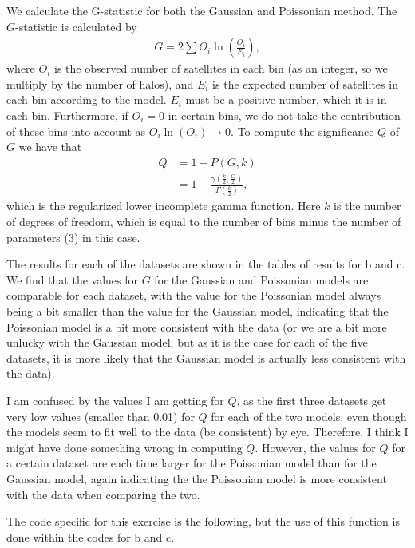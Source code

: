 We calculate the G-statistic for both the Gaussian and Poissonian method.
The $G$-statistic is calculated by 
\begin{align*}
    G = 2\sum O_i \ln(\frac{O_i}{E_i}),
\end{align*}
where $O_i$ is the observed number of satellites in each bin (as an integer, so we multiply by the number of halos), and $E_i$ is the expected number of satellites in each bin according
to the model. $E_i$ must be a positive number, which it is in each bin. Furthermore, if $O_i=0$ in certain bins, we do not take the contribution of these bins into account as $O_i\ln(O_i)\to 0$.
To compute the significance $Q$ of $G$ we have that 
\begin{align*}
    Q &= 1-P(G,k)\\
    &= 1-\frac{\gamma(\frac{k}{2},\frac{G}{2})}{\Gamma(\frac{k}{2})},
\end{align*} 
which is the regularized lower incomplete gamma function. Here $k$ is the number of degrees of freedom,
which is equal to the number of bins minus the number of parameters (3) in this case. 

The results for each of the datasets are shown in the tables of results for b and c.
We find that the values for $G$ for the Gaussian and Poissonian models are comparable for each dataset, with the value for the Poissonian model
always being a bit smaller than the value for the Gaussian model, indicating that the Poissonian model is a bit more consistent with the data (or we are a bit more unlucky with the Gaussian model,
but as it is the case for each of the five datasets, it is more likely that the Gaussian model is actually less consistent with the data). 

I am confused by the values I am getting for $Q$, as the first three datasets get very low values (smaller than 0.01) for $Q$ for each of the two models, even though the models seem to fit well to the 
data (be consistent) by eye. Therefore, I think I might have done something wrong in computing $Q$. However, the values for $Q$ for a certain dataset are each time larger for the Poissonian model than for the 
Gaussian model, again indicating the the Poissonian model is more consistent with the data when comparing the two. 

The code specific for this exercise is the following, but the use of this function is done within the codes for b and c.
